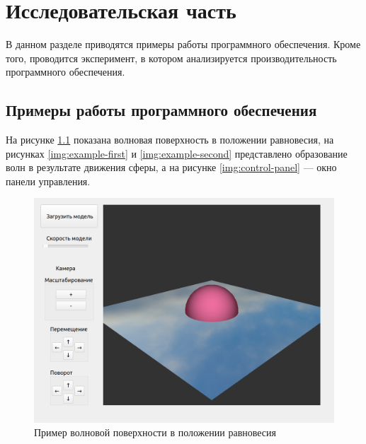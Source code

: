 \chapter{Исследовательская часть}

В данном разделе приводятся примеры работы программного обеспечения. Кроме того, проводится эксперимент, в котором анализируется производительность программного обеспечения.

\section{Примеры работы программного \newline обеспечения}

На рисунке \ref{img:example-start} показана волновая поверхность в положении равновесия, на рисунках \ref{img:example-first} и \ref{img:example-second} представлено образование волн в результате движения сферы, а на рисунке \ref{img:control-panel} --- окно панели управления.

\begin{figure}[H]
	\begin{center}
		\includegraphics[scale=0.25]{img/example-start.png}
	\end{center}
	\captionsetup{justification=centering}
	\caption{Пример волновой поверхности в положении равновесия}
	\label{img:example-start}
\end{figure}


